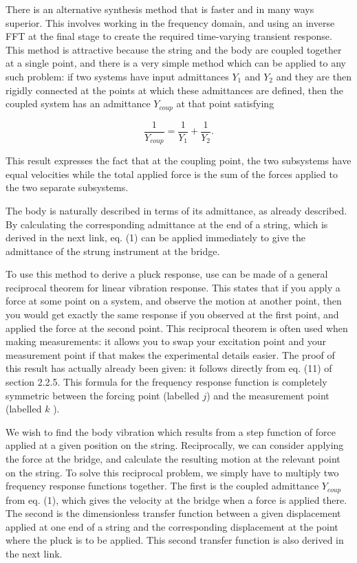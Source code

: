   There is an alternative synthesis method that is faster and in many ways 
  superior. This involves working in the frequency domain, and using an inverse 
  FFT at the final stage to create the required time-varying transient 
  response. This method is attractive because the string and the body are 
  coupled together at a single point, and there is a very simple method which 
  can be applied to any such problem: if two systems have input admittances 
  $Y_1$ and $Y_2$ and they are then rigidly connected at the points at which 
  these admittances are defined, then the coupled system has an admittance 
  $Y_{coup}$ at that point satisfying 

  $$\dfrac{1}{Y_{coup}}=\dfrac{1}{Y_1}+\dfrac{1}{Y_2} . \tag{1}$$ 

  This result expresses the fact that at the coupling point, the two subsystems 
  have equal velocities while the total applied force is the sum of the forces 
  applied to the two separate subsystems. 

  The body is naturally described in terms of its admittance, as already 
  described. By calculating the corresponding admittance at the end of a 
  string, which is derived in the next link, eq. (1) can be applied immediately 
  to give the admittance of the strung instrument at the bridge. 

  To use this method to derive a pluck response, use can be made of a general 
  reciprocal theorem for linear vibration response. This states that if you 
  apply a force at some point on a system, and observe the motion at another 
  point, then you would get exactly the same response if you observed at the 
  first point, and applied the force at the second point. This reciprocal 
  theorem is often used when making measurements: it allows you to swap your 
  excitation point and your measurement point if that makes the experimental 
  details easier. The proof of this result has actually already been given: it 
  follows directly from eq. (11) of section 2.2.5. This formula for the 
  frequency response function is completely symmetric between the forcing point 
  (labelled $j$) and the measurement point (labelled $k$ ). 

  We wish to find the body vibration which results from a step function of 
  force applied at a given position on the string. Reciprocally, we can 
  consider applying the force at the bridge, and calculate the resulting motion 
  at the relevant point on the string. To solve this reciprocal problem, we 
  simply have to multiply two frequency response functions together. The first 
  is the coupled admittance $Y_{coup}$ from eq. (1), which gives the velocity 
  at the bridge when a force is applied there. The second is the dimensionless 
  transfer function between a given displacement applied at one end of a string 
  and the corresponding displacement at the point where the pluck is to be 
  applied. This second transfer function is also derived in the next link. 

